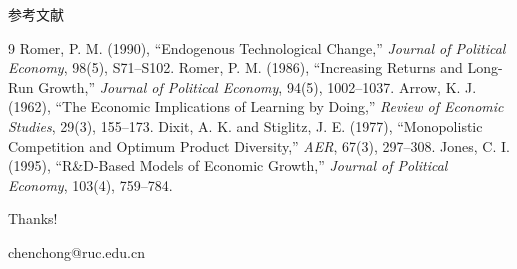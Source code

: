 \documentclass[aspectratio=32]{beamer}
\begin{document}
\begin{frame}{参考文献}
\small
\begin{thebibliography}{9}
 Romer, P. M. (1990), ``Endogenous Technological Change,'' \emph{Journal of Political Economy}, 98(5), S71--S102.
 Romer, P. M. (1986), ``Increasing Returns and Long-Run Growth,'' \emph{Journal of Political Economy}, 94(5), 1002--1037.
 Arrow, K. J. (1962), ``The Economic Implications of Learning by Doing,'' \emph{Review of Economic Studies}, 29(3), 155--173.
 Dixit, A. K. and Stiglitz, J. E. (1977), ``Monopolistic Competition and Optimum Product Diversity,'' \emph{AER}, 67(3), 297--308.
 Jones, C. I. (1995), ``R\&D-Based Models of Economic Growth,'' \emph{Journal of Political Economy}, 103(4), 759--784.
\end{thebibliography}
\end{frame}

\begin{frame}[plain]
\begin{center}
\vfill
{\color{LectureBlue}\Huge Thanks!}\par
\vspace{0.35cm}
\large chenchong@ruc.edu.cn
\vfill
\end{center}
\end{frame}
\end{document}
